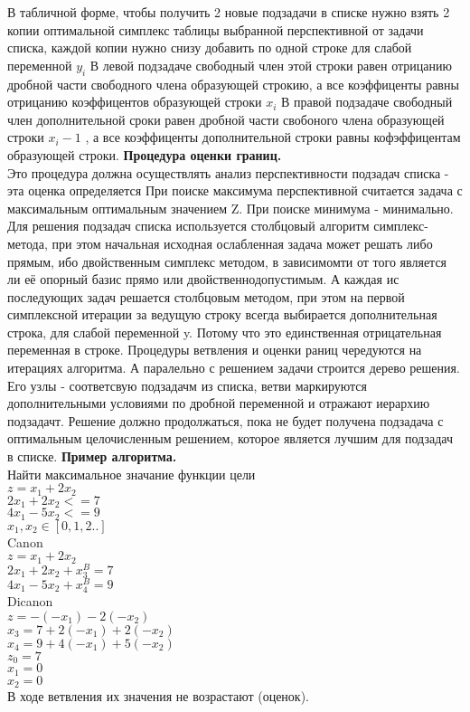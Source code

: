 В табличной форме, чтобы получить 2 новые подзадачи в списке нужно взять 2 копии оптимальной симплекс
таблицы выбранной перспективной от задачи списка, каждой копии нужно снизу добавить по одной строке для слабой переменной $y_i$
В левой подзадаче свободный член этой строки равен отрицанию дробной части свободного члена образующей строкию,
а все коэффиценты равны отрицанию коэффицентов образующей строки $x_i$
В правой подзадаче свободный член дополнительной сроки равен дробной части свобоного члена образующей строки $x_i - 1$ ,
а все коэффиценты дополнительной строки равны кофэффицентам образующей строки.
\textbf{Процедура оценки границ.}\\
Это процедура должна осуществлять анализ перспективности подзадач списка - эта оценка определяется
При поиске максимума перспективной считается задача с максимальным оптимальным значением Z. При поиске минимума - минимально.
Для решения подзадач списка используется столбцовый алгоритм симплекс-метода, при этом начальная исходная ослабленная задача
может решать либо прямым, ибо двойственным симплекс методом, в зависимомти от того является ли её опорный базис прямо или двойственнодопустимым.
А каждая ис последующих задач решается столбцовым методом, при этом на первой симплексной итерации
за ведущую строку всегда выбирается дополнительная строка, для слабой переменной y.
Потому что это единственная отрицательная переменная в строке.
Процедуры ветвления и оценки раниц чередуются на итерациях алгоритма.
А паралельно с решением задачи строится дерево решения. Его узлы - соответсвую подзадачм из списка,
ветви маркируются дополнительными условиями по дробной переменной и отражают иерархию подзадачт.
Решение должно продолжаться, пока не будет получена подзадача с оптимальным целочисленным решением,
которое является лучшим для подзадач в списке.
\textbf{Пример алгоритма.}\\

Найти максимальное значание функции цели \\
$z= x_1 + 2 x_2$\\
$2x_1 + 2x_2 <= 7$\\
$4x_1 - 5x_2 <= 9$\\
$x_1 , x_2 \in [0,1,2..]$\\

Canon\\
$z = x_1 + 2 x_2 $ \\
$2x_1 + 2x_2 + x_3^B = 7$\\
$4x_1 - 5x_2 + x_4^B = 9$\\

Dicanon\\
$z =  -(-x_1) -  2 (-x_2)$\\
$x_3 = 7 +2(-x_1)  + 2 (-x_2)$\\
$x_4 = 9 +4(-x_1)  + 5 (-x_2)$\\

$ z_0 = 7 $\\
$x_1=0$\\
$x_2 =0  $\\

В ходе ветвления их значения не возрастают (оценок).



